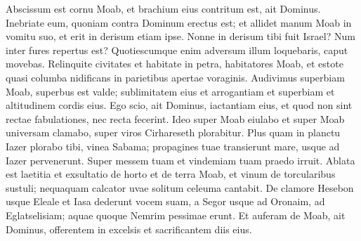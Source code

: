 \begin{biblechapter}
\begin{biblechapter}
\begin{biblechapter}
\begin{biblechapter}
\begin{biblechapter}
\begin{biblechapter}
\begin{biblechapter}
\begin{biblechapter}
\begin{biblechapter}
\begin{biblechapter}
\begin{biblechapter}
\begin{biblechapter}
\begin{biblechapter}
\begin{biblechapter}
\begin{biblechapter}
\begin{biblechapter}
\begin{biblechapter}
\begin{biblechapter}
\begin{biblechapter}
\begin{biblechapter}
\begin{biblechapter}
\begin{biblechapter}
\begin{biblechapter}
\begin{biblechapter}
\begin{biblechapter}
\begin{biblechapter}
\begin{biblechapter}
\begin{biblechapter}
\begin{biblechapter}
\begin{biblechapter}
\begin{biblechapter}
\begin{biblechapter}
\begin{biblechapter}
\begin{biblechapter}
\begin{biblechapter}
\begin{biblechapter}
\begin{biblechapter}
\begin{biblechapter}
\begin{biblechapter}
\begin{biblechapter}
\begin{biblechapter}
\begin{biblechapter}
\begin{biblechapter}
\begin{biblechapter}
\begin{biblechapter}
\begin{biblechapter}
\begin{biblechapter}
\begin{biblechapter}
 \verse Abscissum est cornu Moab,
 et brachium eius contritum est,
 ait Dominus.
 \verse Inebriate eum, quoniam contra Dominum erectus est; et allidet manum Moab in vomitu suo, et erit in derisum etiam ipse. 
\verse Nonne in derisum tibi fuit Israel? Num inter fures repertus est? Quotiescumque enim adversum illum loquebaris, caput movebas.
 \verse Relinquite civitates et habitate in petra,
 habitatores Moab,
 et estote quasi columba nidificans
 in parietibus apertae voraginis.
 \verse Audivimus superbiam Moab,
 superbus est valde;
 sublimitatem eius et arrogantiam
 et superbiam et altitudinem cordis eius.
 \verse Ego scio, ait Dominus, iactantiam eius, et quod non sint rectae fabulationes, nec recta fecerint. 
\verse Ideo super Moab eiulabo et super Moab universam clamabo, super viros Cirhareseth plorabitur.
 \verse Plus quam in planctu Iazer plorabo tibi,
 vinea Sabama;
 propagines tuae transierunt mare,
 usque ad Iazer pervenerunt.
 Super messem tuam et vindemiam tuam
 praedo irruit.
 \verse Ablata est laetitia et exsultatio
 de horto et de terra Moab,
 et vinum de torcularibus sustuli;
 nequaquam calcator uvae
 solitum celeuma cantabit.
 \verse De clamore Hesebon usque Eleale et Iasa dederunt vocem suam, a Segor usque ad Oronaim, ad Eglatselisiam; aquae quoque Nemrim pessimae erunt. 
\verse Et auferam de Moab, ait Dominus, offerentem in excelsis et sacrificantem diis eius. 

\end{biblechapter}
\end{biblechapter}
\end{biblechapter}
\end{biblechapter}
\end{biblechapter}
\end{biblechapter}
\end{biblechapter}
\end{biblechapter}
\end{biblechapter}
\end{biblechapter}
\end{biblechapter}
\end{biblechapter}
\end{biblechapter}
\end{biblechapter}
\end{biblechapter}
\end{biblechapter}
\end{biblechapter}
\end{biblechapter}
\end{biblechapter}
\end{biblechapter}
\end{biblechapter}
\end{biblechapter}
\end{biblechapter}
\end{biblechapter}
\end{biblechapter}
\end{biblechapter}
\end{biblechapter}
\end{biblechapter}
\end{biblechapter}
\end{biblechapter}
\end{biblechapter}
\end{biblechapter}
\end{biblechapter}
\end{biblechapter}
\end{biblechapter}
\end{biblechapter}
\end{biblechapter}
\end{biblechapter}
\end{biblechapter}
\end{biblechapter}
\end{biblechapter}
\end{biblechapter}
\end{biblechapter}
\end{biblechapter}
\end{biblechapter}
\end{biblechapter}
\end{biblechapter}
\end{biblechapter}
